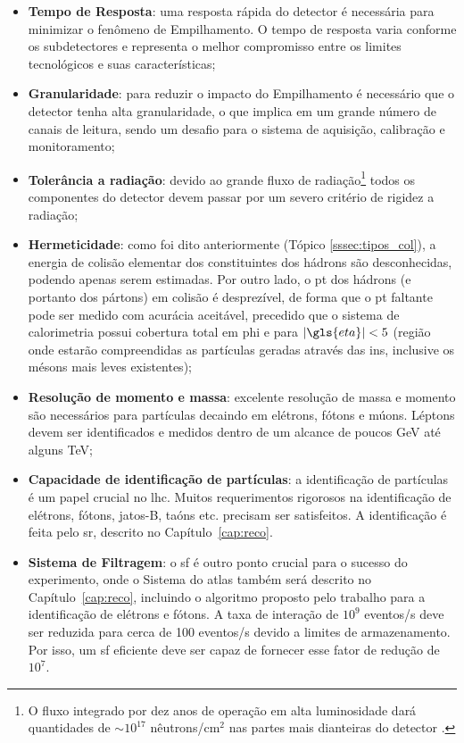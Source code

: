 \begin{itemize}
\item \textbf{Tempo de Resposta}: uma resposta rápida do detector é necessária
para minimizar o fenômeno de Empilhamento. O tempo de resposta varia conforme os
subdetectores e representa o melhor compromisso entre os limites tecnológicos e
suas características;
\item \textbf{Granularidade}: para reduzir o impacto do Empilhamento é
necessário que o detector tenha alta granularidade, o que implica em um grande
número de canais de leitura, sendo um desafio para o sistema de aquisição,
calibração e monitoramento;
\item \textbf{Tolerância a radiação}: devido ao grande fluxo de
radiação\footnote{O fluxo integrado por dez anos de operação em alta
luminosidade dará quantidades de $\sim 10^{17}$ nêutrons/$\text{cm}^2$ nas partes 
mais dianteiras do detector \cite{THESIS_LAR}.} todos os componentes do detector devem passar por 
um severo critério de rigidez a radiação;
\item \textbf{Hermeticidade}: como foi dito anteriormente (Tópico
\ref{sssec:tipos_col}), a energia de colisão elementar dos 
constituintes dos hádrons são desconhecidas, podendo apenas serem estimadas. 
Por outro lado, o \gls{pt} dos hádrons (e portanto dos pártons) 
em colisão é desprezível, de forma que o \acrlong{pt}
faltante pode ser medido com acurácia aceitável, precedido que o sistema de
calorimetria possui cobertura total em \gls{phi} e para $|\gls{eta}|<5$
(região onde estarão compreendidas as partículas geradas através das \glspl{in}, 
inclusive os mésons mais leves existentes);
\item \textbf{Resolução de momento e massa}: excelente resolução de massa e
momento são necessários para partículas decaindo em elétrons, fótons e múons.
Léptons devem ser identificados e medidos dentro de um alcance de poucos GeV até
alguns TeV;
\item \textbf{Capacidade de identificação de partículas}: a identificação de
partículas é um papel crucial no \gls{lhc}. Muitos requerimentos rigorosos na
identificação de elétrons, fótons, jatos-B, taóns etc. precisam ser satisfeitos.
A identificação é feita pelo \glsdesc{sr}, descrito no
Capítulo~\ref{cap:reco}.
\item \textbf{Sistema de Filtragem}: o \glsdesc{sf} é outro ponto
crucial para o sucesso do experimento, onde o Sistema do \gls{atlas} também 
será descrito no Capítulo~\ref{cap:reco}, incluindo o algoritmo proposto pelo trabalho para a
identificação de elétrons e fótons. 
A taxa de interação de $10^9$ eventos/s deve ser reduzida para cerca de 
100 eventos/s devido a limites de armazenamento.
Por isso, um \glsdesc{sf} eficiente deve ser capaz de fornecer esse
fator de redução de $10^7$.  
\end{itemize}

